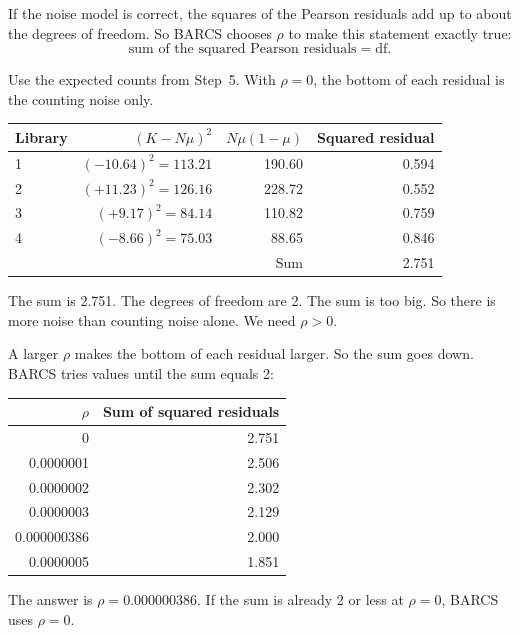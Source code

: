 \documentclass[12pt]{article}
\begin{document}
If the noise model is correct, the squares of the Pearson residuals add up
to about the degrees of freedom. So BARCS chooses $\rho$ to make this
statement exactly true:
\[
\text{sum of the squared Pearson residuals} = \text{df}.
\]

\begin{worked}[ 11: start with \texorpdfstring{$\rho = 0$}{rho = 0}]
Use the expected counts from Step~5. With $\rho = 0$, the bottom of each
residual is the counting noise only.

\begin{tabular}{@{}lrrr@{}}
\toprule
Library & $(K - N\mu)^2$ & $N\mu(1-\mu)$ & Squared residual\\
\midrule
1 & $(-10.64)^2 = 113.21$ & 190.60 & 0.594\\
2 & $(+11.23)^2 = 126.16$ & 228.72 & 0.552\\
3 & $(+9.17)^2 = 84.14$   & 110.82 & 0.759\\
4 & $(-8.66)^2 = 75.03$   &  88.65 & 0.846\\
\midrule
  &  & Sum & 2.751\\
\bottomrule
\end{tabular}

\smallskip
The sum is 2.751. The degrees of freedom are 2. The sum is too big. So
there is more noise than counting noise alone. We need $\rho > 0$.
\end{worked}

\begin{worked}
A larger $\rho$ makes the bottom of each residual larger. So the sum goes
down. BARCS tries values until the sum equals 2:

\begin{tabular}{@{}rr@{}}
\toprule
$\rho$ & Sum of squared residuals\\
\midrule
0           & 2.751\\
0.0000001   & 2.506\\
0.0000002   & 2.302\\
0.0000003   & 2.129\\
0.000000386 & 2.000\\
0.0000005   & 1.851\\
\bottomrule
\end{tabular}

\smallskip
The answer is $\rho = 0.000000386$. If the sum is already 2 or less at
$\rho = 0$, BARCS uses $\rho = 0$.
\end{worked}
\end{document}
